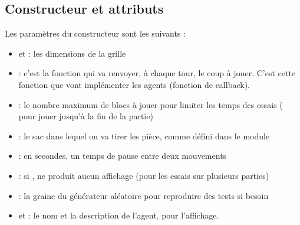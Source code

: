 \subsection{Constructeur et attributs}
Les paramètres du constructeur sont les suivants :
\begin{itemize}
	\item {} et  : les dimensions de la grille
	\item {} : c'est la fonction qui va renvoyer, à chaque tour, le coup à jouer. C'est cette fonction que vont implémenter les agents (fonction de callback).
	\item {} : le nombre maximum de blocs à jouer pour limiter les temps des essais ( pour jouer jusqu'à la fin de la partie)
	\item {} : le sac dans lequel on va tirer les pièce, comme défini dans le module 
	\item {} : en secondes, un temps de pause entre deux mouvements
	\item {} : si , ne produit aucun affichage (pour les essais sur plusieurs parties)
	\item {} : la graine du générateur aléatoire pour reproduire des tests si besoin
	\item {} et  : le nom et la description de l'agent, pour l'affichage.
\end{itemize}

